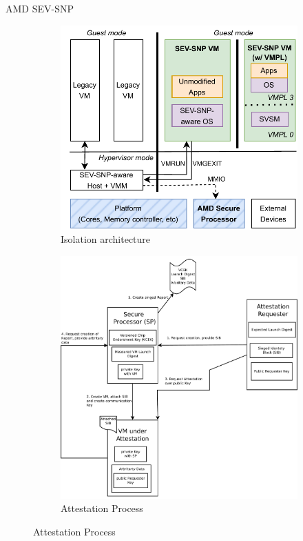 \documentclass[aspectratio=169]{beamer}
\begin{document}
\begin{frame}{AMD SEV-SNP}
    \begin{figure}
        \begin{subfigure}[]{0.45\textwidth}
            \includegraphics[width=\textwidth]{images/svm-snp.png}
            \caption{Isolation architecture}
        \end{subfigure}
        \begin{subfigure}[]{0.45\textwidth}
            \includegraphics[width=\textwidth]{images/sev-snp_remote_attestation.pdf}
            \caption{Attestation Process}
        \end{subfigure}
    \end{figure}
\end{frame}
\end{document}
